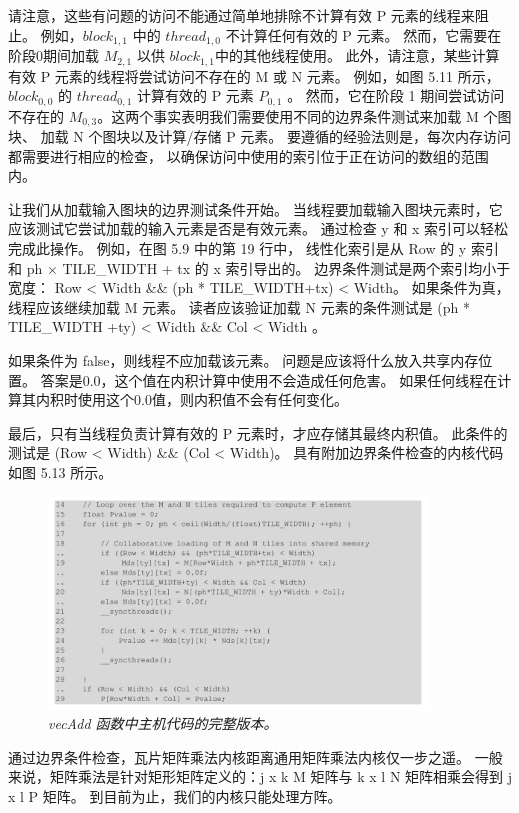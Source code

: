 请注意，这些有问题的访问不能通过简单地排除不计算有效 P 元素的线程来阻止。 
例如，$block_{1,1}$ 中的 $thread_{1,0}$ 不计算任何有效的 P 元素。 
然而，它需要在阶段0期间加载 $M_{2,1}$ 以供 $block_{1,1}$中的其他线程使用。 
此外，请注意，某些计算有效 P 元素的线程将尝试访问不存在的 M 或 N 元素。 
例如，如图 5.11 所示，$block_{0,0}$ 的 $thread_{0,1}$ 计算有效的 P 元素 $P_{0,1}$ 。 
然而，它在阶段 1 期间尝试访问不存在的 $M_{0,3}$。这两个事实表明我们需要使用不同的边界条件测试来加载 M 个图块、
加载 N 个图块以及计算/存储 P 元素。 要遵循的经验法则是，每次内存访问都需要进行相应的检查，
以确保访问中使用的索引位于正在访问的数组的范围内。

让我们从加载输入图块的边界测试条件开始。 当线程要加载输入图块元素时，它应该测试它尝试加载的输入元素是否是有效元素。 
通过检查 y 和 x 索引可以轻松完成此操作。 例如，在图 5.9 中的第 19 行中，
线性化索引是从 Row 的 y 索引和 ph × TILE\_WIDTH + tx 的 x 索引导出的。 
边界条件测试是两个索引均小于宽度： Row < Width \&\& (ph * TILE\_WIDTH+tx) < Width。 
如果条件为真，线程应该继续加载 M 元素。 
读者应该验证加载 N 元素的条件测试是 (ph * TILE\_WIDTH +ty) < Width \&\& Col < Width 。

如果条件为 false，则线程不应加载该元素。 问题是应该将什么放入共享内存位置。 
答案是0.0，这个值在内积计算中使用不会造成任何危害。 如果任何线程在计算其内积时使用这个0.0值，则内积值不会有任何变化。

最后，只有当线程负责计算有效的 P 元素时，才应存储其最终内积值。 
此条件的测试是 (Row < Width) \&\& (Col < Width)。 具有附加边界条件检查的内核代码如图 5.13 所示。

\begin{figure}[H]
	\centering
	\includegraphics[width=0.9\textwidth]{figs/F5.13.png}
	\caption{\textit{\color{red} vecAdd 函数中主机代码的完整版本。}}
\end{figure}

通过边界条件检查，瓦片矩阵乘法内核距离通用矩阵乘法内核仅一步之遥。 
一般来说，矩阵乘法是针对矩形矩阵定义的：j x k M 矩阵与 k x l N 矩阵相乘会得到 j x l P 矩阵。 
到目前为止，我们的内核只能处理方阵。

